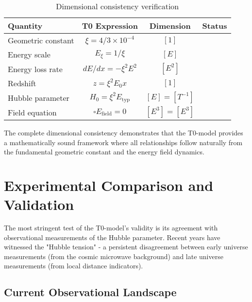 \documentclass[12pt,a4paper]{article}
\begin{document}
	\begin{table}[htbp]
		\centering
		\begin{tabular}{lccc}
			\toprule
			\textbf{Quantity} & \textbf{T0 Expression} & \textbf{Dimension} & \textbf{Status} \\
			\midrule
			Geometric constant & $\xi = 4/3 \times 10^{-4}$ & $[1]$ & \checkmark \\
			Energy scale & $E_\xi = 1/\xi$ & $[E]$ & \checkmark \\
			Energy loss rate & $dE/dx = -\xi^2 E^2$ & $[E^2]$ & \checkmark \\
			Redshift & $z = \xi^2 E_0 x$ & $[1]$ & \checkmark \\
			Hubble parameter & $H_0 = \xi^2 E_{\text{typ}}$ & $[E] = [T^{-1}]$ & \checkmark \\
			Field equation & $\square E_{\text{field}} = 0$ & $[E^3] = [E^3]$ & \checkmark \\
			\bottomrule
		\end{tabular}
		\caption{Dimensional consistency verification}
		\label{tab:dimensional_check}
	\end{table}
	
	The complete dimensional consistency demonstrates that the T0-model provides a mathematically sound framework where all relationships follow naturally from the fundamental geometric constant and the energy field dynamics.
	
	\section{Experimental Comparison and Validation}
	
	The most stringent test of the T0-model's validity is its agreement with observational measurements of the Hubble parameter. Recent years have witnessed the "Hubble tension" - a persistent disagreement between early universe measurements (from the cosmic microwave background) and late universe measurements (from local distance indicators).
	
	\subsection{Current Observational Landscape}
	
\end{document}
